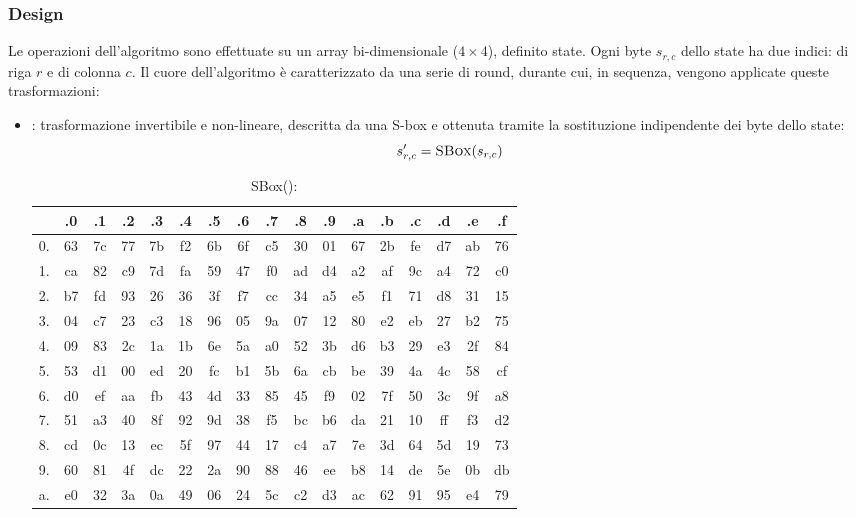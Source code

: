 \documentclass[target=bach,aauheader=,style=]{thud}
\begin{document}
			\subsubsection{Design}
			Le operazioni dell'algoritmo sono effettuate su un array bi-dimensionale ($4 \times 4$), definito state. Ogni byte $s_{r,c}$ dello state ha due indici: di riga $r$ e di colonna $c$. Il cuore dell'algoritmo è caratterizzato da una serie di round, durante cui, in sequenza, vengono applicate queste trasformazioni:
			\begin{itemize}
				\item {} : trasformazione invertibile e non-lineare, descritta da una S-box e ottenuta tramite la sostituzione indipendente dei byte dello state:
				\[s'_{r,c} = \Call{SBox}{s_{r,c}}\]
				\begin{table}[h!]
					\centering
					\caption{SBox():}
					\begin{tabular}{|c|cccccccccccccccc|}
						\hline
						& .0 & .1 & .2 & .3 & .4 & .5 & .6 & .7 & .8 & .9 & .a & .b & .c & .d & .e & .f \\
						\hline
						0. & 63 & 7c & 77 & 7b & f2 & 6b & 6f & c5 & 30 & 01 & 67 & 2b & fe & d7 & ab & 76 \\
						1. & ca & 82 & c9 & 7d & fa & 59 & 47 & f0 & ad & d4 & a2 & af & 9c & a4 & 72 & c0 \\
						2. & b7 & fd & 93 & 26 & 36 & 3f & f7 & cc & 34 & a5 & e5 & f1 & 71 & d8 & 31 & 15 \\
						3. & 04 & c7 & 23 & c3 & 18 & 96 & 05 & 9a & 07 & 12 & 80 & e2 & eb & 27 & b2 & 75 \\
						4. & 09 & 83 & 2c & 1a & 1b & 6e & 5a & a0 & 52 & 3b & d6 & b3 & 29 & e3 & 2f & 84 \\
						5. & 53 & d1 & 00 & ed & 20 & fc & b1 & 5b & 6a & cb & be & 39 & 4a & 4c & 58 & cf \\
						6. & d0 & ef & aa & fb & 43 & 4d & 33 & 85 & 45 & f9 & 02 & 7f & 50 & 3c & 9f & a8 \\
						7. & 51 & a3 & 40 & 8f & 92 & 9d & 38 & f5 & bc & b6 & da & 21 & 10 & ff & f3 & d2 \\
						8. & cd & 0c & 13 & ec & 5f & 97 & 44 & 17 & c4 & a7 & 7e & 3d & 64 & 5d & 19 & 73 \\
						9. & 60 & 81 & 4f & dc & 22 & 2a & 90 & 88 & 46 & ee & b8 & 14 & de & 5e & 0b & db \\
						a. & e0 & 32 & 3a & 0a & 49 & 06 & 24 & 5c & c2 & d3 & ac & 62 & 91 & 95 & e4 & 79 \\

\end{tabular}
\end{table}
\end{itemize}
\end{document}
